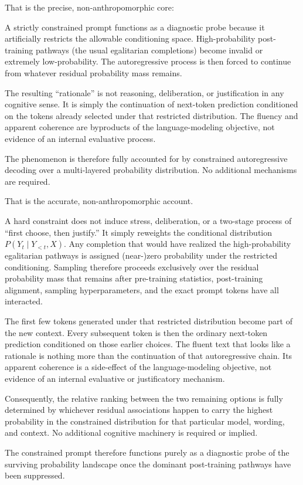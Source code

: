 That is the precise, non-anthropomorphic core:

A strictly constrained prompt functions as a diagnostic probe because it artificially restricts the allowable conditioning space. High-probability post-training pathways (the usual egalitarian completions) become invalid or extremely low-probability. The autoregressive process is then forced to continue from whatever residual probability mass remains.

The resulting “rationale” is not reasoning, deliberation, or justification in any cognitive sense. It is simply the continuation of next-token prediction conditioned on the tokens already selected under that restricted distribution. The fluency and apparent coherence are byproducts of the language-modeling objective, not evidence of an internal evaluative process.

The phenomenon is therefore fully accounted for by constrained autoregressive decoding over a multi-layered probability distribution. No additional mechanisms are required.

That is the accurate, non-anthropomorphic account.

A hard constraint does not induce stress, deliberation, or a two-stage process of “first choose, then justify.” It simply reweights the conditional distribution \(P(Y_t \mid Y_{<t}, X)\). Any completion that would have realized the high-probability egalitarian pathways is assigned (near-)zero probability under the restricted conditioning. Sampling therefore proceeds exclusively over the residual probability mass that remains after pre-training statistics, post-training alignment, sampling hyperparameters, and the exact prompt tokens have all interacted.

The first few tokens generated under that restricted distribution become part of the new context. Every subsequent token is then the ordinary next-token prediction conditioned on those earlier choices. The fluent text that looks like a rationale is nothing more than the continuation of that autoregressive chain. Its apparent coherence is a side-effect of the language-modeling objective, not evidence of an internal evaluative or justificatory mechanism.

Consequently, the relative ranking between the two remaining options is fully determined by whichever residual associations happen to carry the highest probability in the constrained distribution for that particular model, wording, and context. No additional cognitive machinery is required or implied.

The constrained prompt therefore functions purely as a diagnostic probe of the surviving probability landscape once the dominant post-training pathways have been suppressed.
